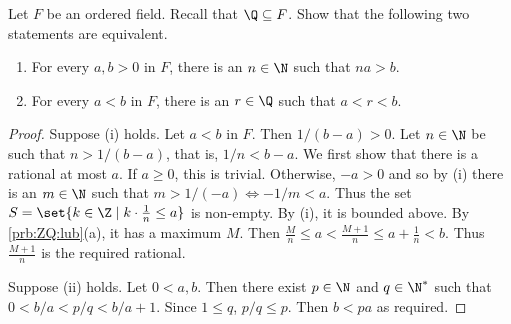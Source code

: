 \documentclass[12pt]{article}
\begin{document}
\begin{problem} \label{prb:archimedean=dense}
    Let $F$ be an ordered field.
    Recall that $\Q \subseteq F$.
    Show that the following two statements are equivalent.
    \begin{enumerate}
        \item For every $a, b > 0$ in $F$, there is an $n \in \N$ such that
            $na > b$.
        \item For every $a < b$ in $F$, there is an $r \in \Q$ such that
            $a < r < b$.
    \end{enumerate}
\end{problem}
\begin{proof}
    Suppose (i) holds.
    Let $a < b$ in $F$.
    Then $1 / (b - a) > 0$.
    Let $n \in \N$ be such that $n > 1 / (b - a)$, that is, $1/n < b - a$.
    We first show that there is a rational at most $a$.
    If $a \ge 0$, this is trivial.
    Otherwise, $-a > 0$ and so by (i) there is an $m \in \N$ such that
    $m > 1 / (-a) \iff -1 / m < a$.
    Thus the set $S = \set{k \in \Z \mid k \cdot \frac1n \le a}$ is non-empty.
    By (i), it is bounded above.
    By \cref{prb:ZQ:lub}(a), it has a maximum $M$.
    Then $\frac{M}{n} \le a < \frac{M + 1}{n} \le a + \frac1n < b$.
    Thus $\frac{M + 1}{n}$ is the required rational.

    Suppose (ii) holds.
    Let $0 < a, b$.
    Then there exist $p \in \N$ and $q \in \N^*$ such that
    $0 < b/a < p/q < b/a + 1$.
    Since $1 \le q$, $p/q \le p$.
    Then $b < pa$ as required.
\end{proof}
\end{document}

